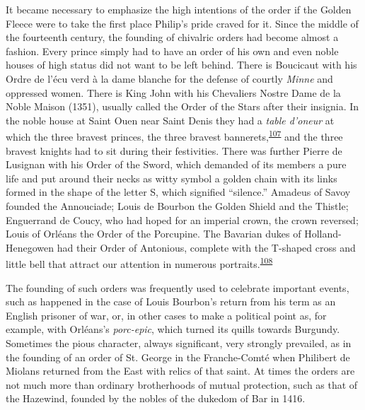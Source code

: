 It became necessary to emphasize the high intentions of the order if the
Golden Fleece were to take the first place Philip's pride craved for it.
Since the middle of the fourteenth century, the founding of chivalric
orders had become almost a fashion. Every prince simply had to have an
order of his own and even noble houses of high status did not want to be
left behind. There is Boucicaut with his Ordre de l'écu verd à la dame
blanche for the defense of courtly \emph{Minne} and oppressed women.
There is King John with his Chevaliers Nostre Dame de la Noble Maison
(1351), usually called the Order of the Stars after their insignia. In
the noble house at Saint Ouen near Saint Denis they had a \emph{table
d'oneur} at which the three bravest princes, the three bravest
bannerets,\textsuperscript{\protect\hypertarget{10_Chapter_Three__THE_HEROIC_DREAM.xhtmlux5cux23id_1721}{\protect\hyperlink{23_NOTES.xhtmlux5cux23id_1722}{107}}}
and the three bravest knights had to sit during their festivities. There
was further Pierre de Lusignan with his Order of the Sword, which
demanded of its members a pure life and put around their necks as witty
symbol a golden chain with its links formed in the shape of the letter
S, which signified ``silence.'' Amadeus of Savoy founded the Annouciade;
Louis de Bourbon the Golden Shield and the Thistle; Enguerrand de Coucy,
who had hoped for an imperial crown, the crown reversed; Louis of
Orléans the Order of the Porcupine. The Bavarian dukes of
Holland-Henegowen had their Order of Antonious,
\protect\hypertarget{10_Chapter_Three__THE_HEROIC_DREAM.xhtmlux5cux23page_95}{}{}complete
with the T-shaped cross and little bell that attract our attention in
numerous
portraits.\textsuperscript{\protect\hypertarget{10_Chapter_Three__THE_HEROIC_DREAM.xhtmlux5cux23id_1719}{\protect\hyperlink{23_NOTES.xhtmlux5cux23id_1720}{108}}}

The founding of such orders was frequently used to celebrate important
events, such as happened in the case of Louis Bourbon's return from his
term as an English prisoner of war, or, in other cases to make a
political point as, for example, with Orléans's \emph{porc-epic}, which
turned its quills towards Burgundy. Sometimes the pious character,
always significant, very strongly prevailed, as in the founding of an
order of St. George in the Franche-Comté when Philibert de Miolans
returned from the East with relics of that saint. At times the orders
are not much more than ordinary brotherhoods of mutual protection, such
as that of the Hazewind, founded by the nobles of the dukedom of Bar in
1416.

